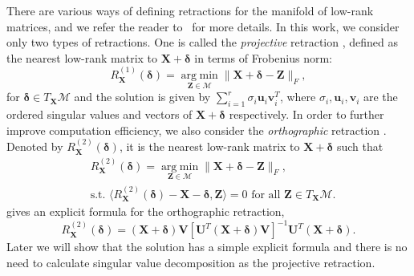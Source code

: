 \documentclass[12pt]{article}
\newcommand{\argmin}{\operatorname*{arg\; min}}
\newcommand{\bZ}{\boldsymbol{Z}}
\newcommand{\bX}{\boldsymbol{X}}
\newcommand{\bU}{\boldsymbol{U}}
\newcommand{\bV}{\boldsymbol{V}}
\def\bu{\boldsymbol{u}}
\def\bU{\boldsymbol{U}}
\def\bv{\boldsymbol{v}}
\def\calM{\mathcal{M}}
\def\bd{\boldsymbol{\delta}}
\theoremstyle{plain}
\theoremstyle{definition}
\theoremstyle{plain}
\theoremstyle{plain}
\theoremstyle{remark}
\begin{document}
There are various ways of defining retractions for the manifold of low-rank matrices, and we refer the reader to~\cite{Absil2015} for more details. In this work, we consider only two types of retractions. One is called the \textit{projective} retraction \cite{Shalit:2012:OLE:2503308.2188399,Vandereycken2013}, defined as the nearest low-rank matrix to $\bX+\bd$ in terms of Frobenius norm: 
\begin{equation}\label{eq:projective}
R_{\bX}^{(1)}(\bd)=\argmin_{\bZ\in\calM }\|\bX+\bd-\bZ\|_F,
\end{equation}
for $\bd\in T_{\bX}\calM$ and the solution is given by $\sum_{i=1}^r\sigma_i\bu_i\bv_i^T$, where $\sigma_i,\bu_i,\bv_i$ are the ordered singular values and vectors of $\bX+\bd$ respectively. In order to further improve computation efficiency,  we also consider the \textit{orthographic} retraction \cite{Absil2015}. Denoted by $R^{(2)}_{\bX}(\bd)$, it is the nearest low-rank matrix to $\bX+\bd$ such that 
\begin{align}\label{eq:projective}
&R_{\bX}^{(2)}(\bd)=\argmin_{\bZ\in\calM }\|\bX+\bd-\bZ\|_F,\nonumber\\
&\text{s.t. }\langle R^{(2)}_{\bX}(\bd)-\bX-\bd, \bZ\rangle=0\,\,\text{for all $\bZ\in  T_{\bX}\calM$}. 
\end{align} 
\cite[Section 3.2]{Absil2015} gives an explicit formula for the orthographic retraction, 
\begin{equation}\label{eq:ortho_retraction}
R^{(2)}_{\bX}(\bd)=(\bX+\bd)\bV[\bU^{T}(\bX+\bd)\bV]^{-1}\bU^{T}(\bX+\bd).
\end{equation}
Later we will show that the solution has a simple explicit formula and there is no need to calculate singular value decomposition as the projective retraction. 

 
\end{document}
